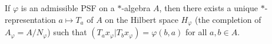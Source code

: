 If $\varphi$ is an admissible PSF on a $*$-algebra $A$, then there exists a unique $*$-representation $a \mapsto T_a$ of $A$ on the Hilbert space $H_\varphi$ (the completion of $A_\varphi = A/N_\varphi$) such that $(T_a x_\varphi | T_b x_\varphi) = \varphi(b, a)$ for all $a, b \in A$.
